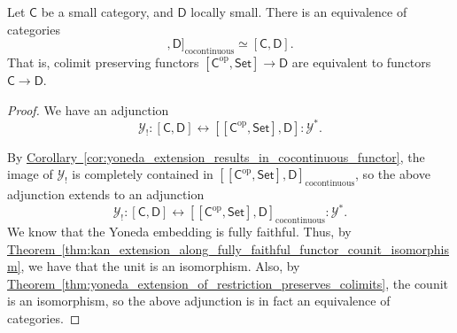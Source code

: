 \documentclass[notes.tex]{subfiles}
\begin{document}
\begin{corollary}
  Let $\mathsf{C}$ be a small category, and $\mathsf{D}$ locally small. There is an equivalence of categories
  \begin{equation*}
    [[\mathsf{C}^{\mathrm{op}}, \mathsf{Set}], \mathsf{D}]_{\mathrm{cocontinuous}} \simeq [\mathsf{C}, \mathsf{D}].
  \end{equation*}
  That is, colimit preserving functors $[\mathsf{C}^{\mathrm{op}}, \mathsf{Set}] \to \mathsf{D}$ are equivalent to functors $\mathsf{C} \to \mathsf{D}$.
\end{corollary}
\begin{proof}
  We have an adjunction
  \begin{equation*}
    \mathcal{Y}_{!}: [\mathsf{C}, \mathsf{D}] \leftrightarrow [[\mathsf{C}^{\mathrm{op}}, \mathsf{Set}], \mathsf{D}] : \mathcal{Y}^{*}.
  \end{equation*}

  By \hyperref[cor:yoneda_extension_results_in_cocontinuous_functor]{Corollary~\ref*{cor:yoneda_extension_results_in_cocontinuous_functor}}, the image of $\mathcal{Y}_{!}$ is completely contained in $[[\mathsf{C}^{\mathrm{op}}, \mathsf{Set}], \mathsf{D}]_{\mathrm{cocontinuous}}$, so the above adjunction extends to an adjunction
  \begin{equation*}
    \mathcal{Y}_{!}: [\mathsf{C}, \mathsf{D}] \leftrightarrow [[\mathsf{C}^{\mathrm{op}}, \mathsf{Set}], \mathsf{D}]_{\mathrm{cocontinuous}} : \mathcal{Y}^{*}.
  \end{equation*}
  We know that the Yoneda embedding is fully faithful. Thus, by \hyperref[thm:kan_extension_along_fully_faithful_functor_counit_isomorphism]{Theorem~\ref*{thm:kan_extension_along_fully_faithful_functor_counit_isomorphism}}, we have that the unit is an isomorphism. Also, by \hyperref[thm:yoneda_extension_of_restriction_preserves_colimits]{Theorem~\ref*{thm:yoneda_extension_of_restriction_preserves_colimits}}, the counit is an isomorphism, so the above adjunction is in fact an equivalence of categories.
\end{proof}
\end{document}

